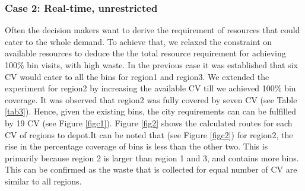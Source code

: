 \documentclass[12pt]{article}
\begin{document}
\subsubsection*{Case 2: Real-time, unrestricted}

Often the decision makers want to derive the requirement of resources that could cater to the whole demand. To achieve that, we relaxed the constraint on available resources to deduce the the total resource requirement for achieving 100\% bin visits, with high waste. In the previous case it was established that six CV would cater to all the bins for region1 and region3. We extended the experiment for region2 by increasing the available CV till we achieved 100\% bin coverage. It was observed that region2 was fully covered by seven CV (see Table \ref{tab3}). Hence, given the existing bins, the city requirements can can be  fulfilled by 19 CV (see Figure \ref{figc1}). Figure \ref{fig2} shows the calculated routes for each CV of regions to depot.It can be noted that (see Figure \ref{figc2}) for region2, the rise in the percentage coverage of bins is less than the other two. This is primarily because region 2 is larger than region 1 and 3, and contains more bins. This can be confirmed as the waste that is collected for equal number of CV are similar to all regions. 
\end{document}
